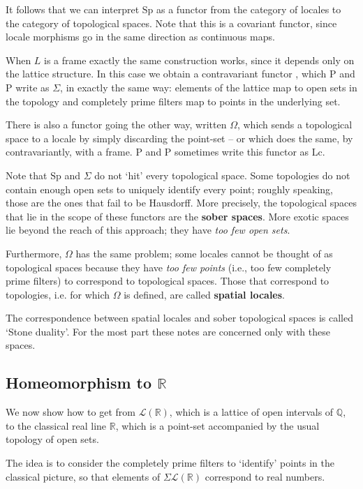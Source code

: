 \documentclass[oneside,english]{amsbook}
\numberwithin{section}{chapter}
\theoremstyle{plain}
\theoremstyle{definition}
\begin{document}
It follows that we can interpret $\text{Sp}$ as a functor from the category of locales to the category of topological spaces. Note that this is a covariant functor, since locale morphisms go in the same direction as continuous maps.

When $L$ is a frame exactly the same construction works, since it depends only on the lattice structure. In this case we obtain a contravariant functor , which P and P write as $\Sigma$, in exactly the same way: elements of the lattice map to open sets in the topology and completely prime filters map to points in the underlying set.

There is also a functor going the other way, written $\Omega$, which sends a topological space to a locale by simply discarding the point-set -- or which does the same, by contravariantly, with a frame. P and P sometimes write this functor as $\text{Lc}$.

Note that  $\text{Sp}$ and $\Sigma$ do not `hit' every topological space. Some topologies do not contain enough open sets to uniquely identify every point; roughly speaking, those are the ones that fail to be Hausdorff. More precisely, the topological spaces that lie in the scope of these functors are the \textbf{sober spaces}. More exotic spaces lie beyond the reach of this approach; they have \emph{too few open sets}.

Furthermore, $\Omega$ has the same problem; some locales cannot be thought of as topological spaces because they have \emph{too few points} (i.e., too few completely prime filters) to correspond to topological spaces. Those that correspond to topologies, i.e. for which $\Omega$ is defined, are called \textbf{spatial locales}.

The correspondence between spatial locales and sober topological spaces is called `Stone duality'. For the most part these notes are concerned only with these spaces.

\subsection{Homeomorphism to $\mathbb{R}$}

We now show how to get from $\mathscr{L}(\mathbb{R})$, which is a lattice of open intervals of $\mathbb{Q}$, to the classical real line $\mathbb{R}$, which is a point-set accompanied by the usual topology of open sets. 

The idea is to consider the completely prime filters to `identify' points in the classical picture, so that elements of $\Sigma \mathscr{L}(\mathbb{R})$ correspond to real numbers.
\end{document}

